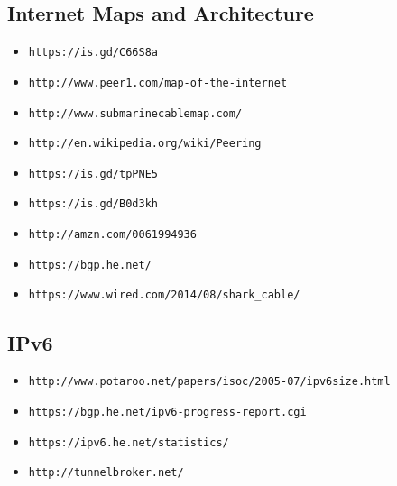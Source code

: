 \documentclass[xga]{xdvislides}
\begin{document}
\subsection{Internet Maps and Architecture}
\begin{itemize}
	\item \verb+https://is.gd/C66S8a+
	\item \verb+http://www.peer1.com/map-of-the-internet+
	\item \verb+http://www.submarinecablemap.com/+
	\item \verb+http://en.wikipedia.org/wiki/Peering+
	\item \verb+https://is.gd/tpPNE5+
	\item \verb+https://is.gd/B0d3kh+
	\item \verb+http://amzn.com/0061994936+
	\item \verb+https://bgp.he.net/+
	\item \verb+https://www.wired.com/2014/08/shark_cable/+
\end{itemize}

\subsection{IPv6}
\begin{itemize}
	\item \verb+http://www.potaroo.net/papers/isoc/2005-07/ipv6size.html+
	\item \verb+https://bgp.he.net/ipv6-progress-report.cgi+
	\item \verb+https://ipv6.he.net/statistics/+
	\item \verb+http://tunnelbroker.net/+
\end{itemize}

%
\end{document}
